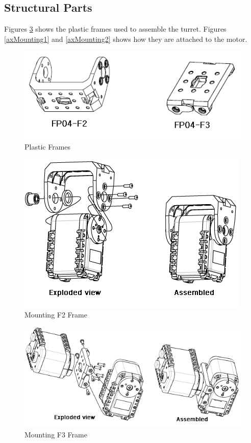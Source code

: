 \subsection{Structural Parts}
Figures \ref{fig:axFrames} shows the plastic frames used to assemble the turret. Figures \ref{axMounting1} and \ref{axMounting2} shows how they are attached to the motor.
\begin{figure}
	\centering
	\includegraphics[width=\textwidth]{img/axFrames.png}%
	\caption{Plastic Frames}
	\label{fig:axFrames}
\end{figure}
\begin{figure}
	\centering
	\includegraphics[width=\textwidth]{img/axMounting1.png}%
	\caption{Mounting F2 Frame}
	\label{fig:axFrames}
\end{figure}
\begin{figure}
	\centering
	\includegraphics[width=\textwidth]{img/axMounting2.png}%
	\caption{Mounting F3 Frame}
	\label{fig:axFrames}
\end{figure}
